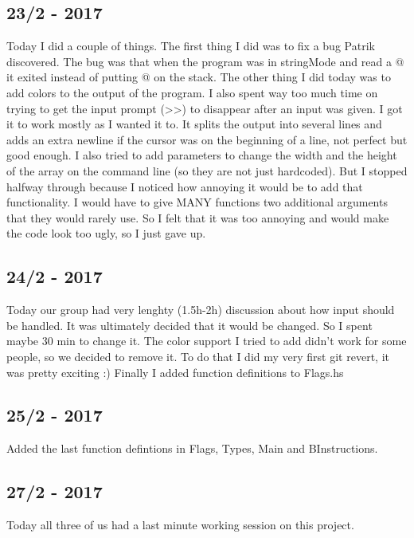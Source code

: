\documentclass[12pt, a4paper]{article}
\begin{document}
\subsection*{23/2 - 2017}
Today I did a couple of things. The first thing I did was to fix a bug Patrik
discovered. The bug was that when the program was in stringMode and read a @
it exited instead of putting @ on the stack.
The other thing I did today was to add colors to the output of the program. I also
spent way too much time on trying to get the input prompt (>>) to disappear after
an input was given. I got it to work mostly as I wanted it to. It splits the output
into several lines and adds an extra newline if the cursor was on the beginning
of a line, not perfect but good enough.
I also tried to add parameters to change the width and the height of the array
on the command line (so they are not just hardcoded). But I stopped halfway
through because I noticed how annoying it would be to add that functionality.
I would have to give MANY functions two additional arguments that they would
rarely use. So I felt that it was too annoying and would make the code look too
ugly, so I just gave up.

\subsection*{24/2 - 2017}
Today our group had very lenghty (1.5h-2h) discussion about how input should be handled.
It was ultimately decided that it would be changed. So I spent maybe 30 min to
change it.
The color support I tried to add didn't work for some people, so we decided to
remove it. To do that I did my very first git revert, it was pretty exciting :)
Finally I added function definitions to Flags.hs

\subsection*{25/2 - 2017}
Added the last function defintions in Flags, Types, Main and BInstructions.

\subsection*{27/2 - 2017}
Today all three of us had a last minute working session on this project.
\end{document}
